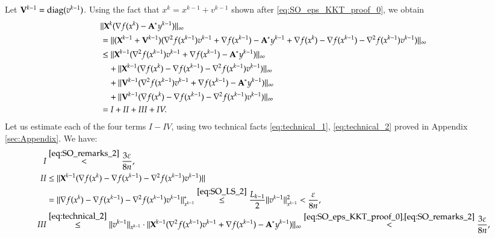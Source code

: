 Let $\mathbf{V}^{k-1} = \operatorname{diag}(v^{k-1})$. Using the fact that $x^{k}=x^{k-1}+v^{k-1}$ shown after \eqref{eq:SO_eps_KKT_proof_0}, we obtain
\begin{align*}
& \norm{\XX^{k}(\nabla f(x^{k})-\bA^{\ast}y^{k-1})}_{\infty} \notag \\
& = \norm{(\XX^{k-1}+\mathbf{V}^{k-1})(\nabla^2 f(x^{k-1})v^{k-1} +\nabla f(x^{k-1})-\bA^{\ast}y^{k-1} + \nabla f(x^{k}) - \nabla f(x^{k-1}) - \nabla^2 f(x^{k-1})v^{k-1})}_{\infty} \notag  \\
& \leq \norm{\XX^{k-1}(\nabla^2 f(x^{k-1})v^{k-1} +\nabla f(x^{k-1})-\bA^{\ast}y^{k-1} )}_{\infty}\\ %
& \hspace{1em} + \norm{\XX^{k-1} (\nabla f(x^{k}) - \nabla f(x^{k-1}) - \nabla^2 f(x^{k-1})v^{k-1})}_{\infty}\\ %
& \hspace{1em} + \norm{\mathbf{V}^{k-1}(\nabla^2 f(x^{k-1})v^{k-1} +\nabla f(x^{k-1})-\bA^{\ast}y^{k-1} )}_{\infty}\\ %
& \hspace{1em} + \norm{ \mathbf{V}^{k-1}(\nabla f(x^{k}) - \nabla f(x^{k-1}) - \nabla^2 f(x^{k-1})v^{k-1})}_{\infty}\\ %
&=I+II+III+IV.
\end{align*}
Let us estimate each of the four terms $I-IV$, using two technical facts \eqref{eq:technical_1}, \eqref{eq:technical_2} proved in Appendix \ref{sec:Appendix}. We have:
\begin{align*}
 I& \stackrel{\eqref{eq:SO_remarks_2}}{<} \frac{3\varepsilon}{8n}, \\
II& \leq \lVert\mathbf{X}^{k-1} (\nabla f(x^{k}) - \nabla f(x^{k-1}) - \nabla^2 f(x^{k-1})v^{k-1})\rVert\\
& = \lVert\nabla f(x^{k}) - \nabla f(x^{k-1}) - \nabla^2 f(x^{k-1})v^{k-1}\rVert_{x^{k-1}}^* \stackrel{\eqref{eq:SO_LS_2}}{\leq} \frac{L_{k-1}}{2}\lVert v^{k-1}\rVert_{x^{k-1}}^2<\frac{\varepsilon}{8n}, \\
III&  \stackrel{\eqref{eq:technical_2}}{\leq} \lVert v^{k-1}\rVert_{x^{k-1}} \cdot \lVert\mathbf{X}^{k-1} (\nabla^2 f(x^{k-1})v^{k-1} +\nabla f(x^{k-1})-{\mathbf A}^{\ast}y^{k-1} )\rVert_{\infty}  \stackrel{\eqref{eq:SO_eps_KKT_proof_0},\eqref{eq:SO_remarks_2}}{<}\frac{3\varepsilon}{8n},
\end{align*}
